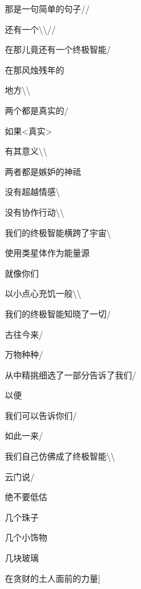 \documentclass[AutoFakeBold=true]{book}
\begin{document}
{那是一句简单的句子//

{\Large 还有一个\textbackslash\textbackslash//}

在那儿竟还有一个终极智能/

在那风烛残年的

地方\textbackslash\textbackslash

两个都是真实的/

如果<真实>

有其意义\textbackslash\textbackslash

两者都是嫉妒的神祗

没有超越情感\textbackslash

没有协作行动\textbackslash\textbackslash

我们的终极智能横跨了宇宙\textbackslash

使用类星体作为能量源

就像你们

以小点心充饥一般\textbackslash\textbackslash

我们的终极智能知晓了一切/

古往今来/

万物种种/

从中精挑细选了一部分告诉了我们/

以便

我们可以告诉你们/

如此一来/

我们自己仿佛成了终极智能\textbackslash\textbackslash

云门说/

绝不要低估

几个珠子

几个小饰物

几块玻璃

在贪财的土人面前的力量]}

\vspace*{1em}
\end{document}
